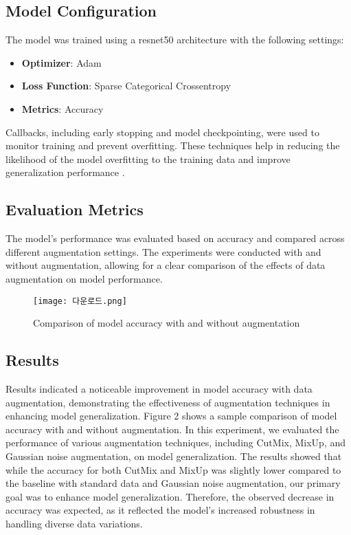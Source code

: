 \documentclass[12pt]{article}
\begin{document}
\subsection{Model Configuration}
The model was trained using a resnet50 architecture with the following settings:
\begin{itemize}
    \item \textbf{Optimizer}: Adam
    \item \textbf{Loss Function}: Sparse Categorical Crossentropy
    \item \textbf{Metrics}: Accuracy
\end{itemize}
Callbacks, including early stopping and model checkpointing, were used to monitor training and prevent overfitting. These techniques help in reducing the likelihood of the model overfitting to the training data and improve generalization performance \cite{author_year}.

\subsection{Evaluation Metrics}
The model's performance was evaluated based on accuracy and compared across different augmentation settings. The experiments were conducted with and without augmentation, allowing for a clear comparison of the effects of data augmentation on model performance.


\begin{figure}[h!]
\centering
\texttt{[image: 다운로드.png]}
\caption{Comparison of model accuracy with and without augmentation}
\end{figure}


\subsection{Results}
Results indicated a noticeable improvement in model accuracy with data augmentation, demonstrating the effectiveness of augmentation techniques in enhancing model generalization. Figure 2 shows a sample comparison of model accuracy with and without augmentation. 
 In this experiment, we evaluated the performance of various augmentation techniques, including CutMix, MixUp, and Gaussian noise augmentation, on model generalization. The results showed that while the accuracy for both CutMix and MixUp was slightly lower compared to the baseline with standard data and Gaussian noise augmentation, our primary goal was to enhance model generalization. Therefore, the observed decrease in accuracy was expected, as it reflected the model’s increased robustness in handling diverse data variations.
\end{document}
